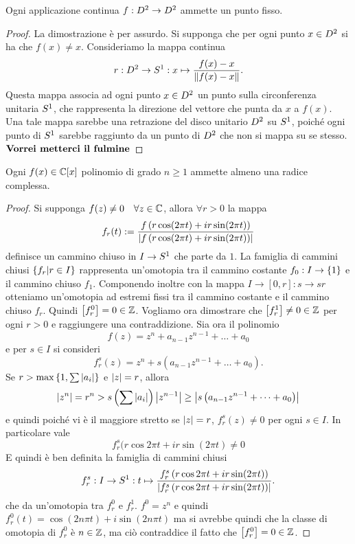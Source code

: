 \documentclass[]{article}
\begin{document}
\begin{theorem} [Brouwer] \nl
    Ogni applicazione continua $f: D^{2} \to D^{2}$ ammette un punto fisso.
\end{theorem}

\begin{proof}
    La dimostrazione \`e per assurdo. \nl
    Si supponga che per ogni punto $x \in D^{2}$ si ha che $f(x) \neq x$. \nl
    Consideriamo la mappa continua
    \[
        r: D^{2} \to S^{1}: x \mapsto \frac{f(x) - x}{\left\| f(x) - x \right\|}.
    \]
    Questa mappa associa ad ogni punto $x \in D^{2}$ un punto sulla circonferenza unitaria $S^{1}$, che rappresenta la direzione del vettore che punta da $x$ a $f(x)$. \nl
    Una tale mappa sarebbe una retrazione del disco unitario $D^{2}$ su $S^{1}$, poiché ogni punto di $S^{1}$ sarebbe raggiunto da un punto di $D^{2}$ che non si mappa su se stesso. 
    $\textbf{Vorrei metterci il fulmine}$
\end{proof}

\begin{theorem}  \nl
    Ogni $f(x) \in \mathbb{C}[x]$ polinomio di grado $n \geq 1$ ammette almeno una radice complessa.
\end{theorem}

\begin{proof} \nl
    Si supponga $f(z) \neq 0 \quad \forall z \in \mathbb{C}$, allora $\forall r > 0$ la mappa
    \[
        f_r(t) := \frac{f\left(r \cos(2\pi t) + ir\sin(2 \pi t)\right)}{\left| f\left(r \cos(2\pi t) + ir\sin(2 \pi t)\right) \right|}
    \]
    definisce un cammino chiuso in $I \to S^{1}$ che parte da $1$. \nl
    La famiglia di cammini chiusi $\left\{ f_r | r \in I \right\}$ rappresenta un'omotopia tra il cammino costante $f_0: I \to \left\{ 1 \right\}$ e il cammino chiuso
    $f_1$. \nl
    Componendo inoltre con la mappa $I \to [0,r]: s \to sr$ otteniamo un'omotopia ad estremi fissi tra il cammino costante e il cammino chiuso $f_r$. \nl
    Quindi $\left[f_r^0 \right] = 0 \in \mathbb{Z}$. Vogliamo ora dimostrare che $\left[f_r^1 \right] \neq 0 \in \mathbb{Z}$  per ogni $r > 0$ e raggiungere una contraddizione. \nl
    Sia ora il polinomio
    \[
        f(z) = z^n + a_{n-1}z^{n-1} + \ldots + a_0
    \]
    e per $s \in I$ si consideri
    \[
        f_r^s(z) = z^n + s\left( a_{n-1}z^{n-1} + \ldots + a_0 \right).
    \]
    Se $r > \max\left\{ 1, \sum \left| a_i \right| \right\}$ e $\left| z \right| = r$, allora
    \[
        \left| z^n \right| = r^n > s \left( \sum \left| a_i \right| \right) \left| z^{n-1} \right| \geq \left| s\left(a_{n-1}z^{n-1} + \dots + a_0\right) \right|
    \]
    e quindi poich\'e vi \`e il maggiore stretto se $\left| z \right| = r$, $f_r^s(z) \neq 0$ per ogni $s \in I$. \nl
    In particolare vale 
    \[
        f_r^s(r \cos{2\pi t} + ir\sin(2 \pi t) \neq 0 
    \]
    E quindi \`e ben definita la famiglia di cammini chiusi
    \[
        f_r^s: I \to S^{1}: t \mapsto \frac{f_r^s\left(r \cos{2\pi t} + ir\sin(2 \pi t)\right)}{\left| f_r^s\left(r \cos{2\pi t} + ir\sin(2 \pi t)\right) \right|}.
    \]
    che da un'omotopia tra $f_r^0$ e $f_r^1$. \nl
    $f^0 = z^n$ e quindi $f_r^0(t) = \cos(2 n \pi t) + i\sin(2 n \pi t)$
    ma si avrebbe quindi che la classe di omotopia di $f_r^0$ \`e $n \in \mathbb{Z}$, ma ci\`o contraddice il fatto che
    $\left[f_r^0 \right] = 0 \in \mathbb{Z}$.
\end{proof}
\end{document}
